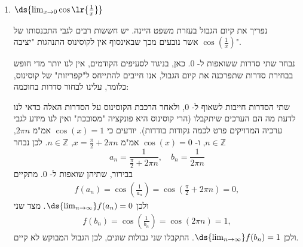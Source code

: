 \begin{enumerate}
\item $\ds{\lim_{x \to 0} \cos\lr{\frac{1}{x} }}$
\ifsol
{}
\begin{solbox}
נפריך את קיום הגבול בעזרת משפט היינה.
יש חששות רבים לגבי התכנסותו
של
$\cos\left(\frac{1}{x}\right)$
אשר נובעים מכך שבאינסוף אין לקוסינוס התנהגות "יציבה".

נבחר שתי סדרות ששואפות ל-
$0$.
כאן, בניגוד לסעיפים הקודמים, אין לנו יותר מדי חופש בבחירת סדרות שתפרכנה את קיום הגבול, אנו חייבים להתייחס ל"קפריזות" של קוסינוס, כלומר, עלינו לבחור סדרות בחוכמה:

שתי הסדרות חייבות לשאוף ל-
$0$,
ולאחר הרכבת הקוסינוס על הסדרות האלה כדאי לנו לדעת מה הם הערכים שיתקבלו
(הרי קוסינוס היא פונקציה "מסובכת" ואין לנו מידע לגבי ערכיה המדויקים פרט לכמה נקודות בודדות).
יודעים כי
$\cos(x)=1$
אמ"מ
$2\pi n$, $n\in\mathbb{Z}$,
ו-
$\cos(x)=0$
אמ"מ
$x=\tfrac{\pi}{2}+2\pi n$, $n\in\mathbb{Z}$.
לכן נבחר
$$a_n=\frac{1}{\tfrac{\pi}{2}+2\pi n},\quad b_n=\frac{1}{2\pi n}$$
בבירור, שתיהן שואפות ל-
$0$.
מתקיים
\begin{align*}
f(a_n)
=\cos\left(\frac{1}{a_n}\right)
= \cos\left(\tfrac{\pi}{2}+2\pi n\right)
= 0,
\end{align*}
ולכן
$\ds{\lim_{n\to\infty}}f(a_n)=0$.
מצד שני
\begin{align*}
f(b_n)
= \cos\left(\frac{1}{b_n}\right)
=\cos\left(2\pi n\right)
= 1,
\end{align*}
ולכן
$\ds{\lim_{n\to\infty}}f(b_n)=1$.
התקבלו שני גבולות שונים, לכן הגבול המבוקש לא קיים.
\end{solbox}
\fi


\end{enumerate}

